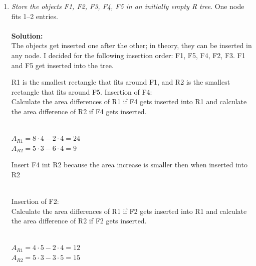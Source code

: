 \begin{enumerate}
\item
  {\em Store the objects F1, F2, F3, F4, F5 in an initially empty R tree}.
  One node fits 1--2 entries.\\\\
  {\bf Solution:}\\
  The objects get inserted one after the other; in theory, they can be inserted in any node. 
  I decided for the following insertion order: F1, F5, F4, F2, F3. F1 and F5 get inserted into the tree.\\
\begin{center}
\end{center}
  

R1 is the smallest rectangle that fits around F1, and R2 is the smallest rectangle that fits around F5. Insertion of F4:\\
Calculate the area differences of R1 if F4 gets inserted into R1 and calculate the area difference of R2 if F4 gets inserted.\\\\
  \begin{center}
    $A_{R1} = 8 \cdot 4 - 2 \cdot 4 = 24$\\
    $A_{R2} = 5 \cdot 3 - 6 \cdot 4 = 9$
  \end{center}
    
  Insert F4 int R2 because the area increase is smaller then when inserted into R2\\\\
  \begin{center}
  \end{center}
  Insertion of F2:\\
  Calculate the area differences of R1 if F2 gets inserted into R1 and calculate the area difference of R2 if F2 gets inserted.\\\\
  \begin{center}
    $A_{R1} = 4 \cdot 5 - 2 \cdot 4 = 12$\\
    $A_{R2} = 5 \cdot 3 - 3 \cdot 5 = 15$
  \end{center}
    

\end{enumerate}
